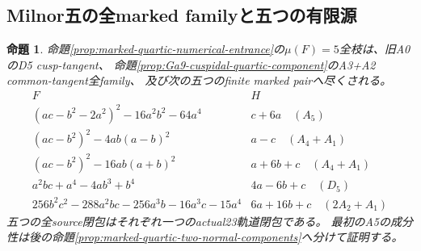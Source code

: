 \documentclass[a4paper,11pt]{ltjsarticle}
\newtheorem{proposition}{命題}[section]
\theoremstyle{definition}
\begin{document}
\subsection{Milnor五の全marked familyと五つの有限源}
\begin{proposition}\label{prop:marked-quartic-mu5-whole-list}
命題\ref{prop:marked-quartic-numerical-entrance}の$\mu(F)=5$全枝は、旧A0のD5 cusp-tangent、
命題\ref{prop:Ga9-cuspidal-quartic-component}のA3+A2 common-tangent全family、
及び次の五つのfinite marked pairへ尽くされる。
\[
\begin{array}{c|l}
 F&H\\\hline
 (ac-b^2-2a^2)^2-16a^2b^2-64a^4&c+6a\quad(A_5)\\
 (ac-b^2)^2-4ab(a-b)^2&a-c\quad(A_4+A_1)\\
 (ac-b^2)^2-16ab(a+b)^2&a+6b+c\quad(A_4+A_1)\\
 a^2bc+a^4-4ab^3+b^4&4a-6b+c\quad(D_5)\\
 256b^2c^2-288a^2bc-256a^3b-16a^3c-15a^4&6a+16b+c\quad(2A_2+A_1)
\end{array}
\]
五つの全source閉包はそれぞれ一つのactual23軌道閉包である。
最初のA5の成分性は後の命題\ref{prop:marked-quartic-two-normal-components}へ分けて証明する。
\end{proposition}
\end{document}
